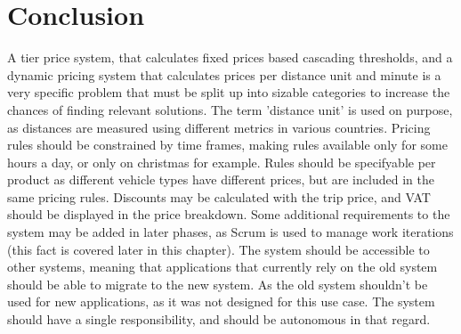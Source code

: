 \graphicspath{{Chapter6/Figs/Vector/}{Chapter6/Figs/}}

%
\chapter{Conclusion}

A tier price system, that calculates fixed prices based cascading thresholds, and a dynamic pricing system that calculates prices per distance unit and minute is a very specific problem that must be split up into sizable categories to increase the chances of finding relevant solutions. The term 'distance unit' is used on purpose, as distances are measured using different metrics in various countries. Pricing rules should be constrained by time frames, making rules available only for some hours a day, or only on christmas for example. Rules should be specifyable per product as different vehicle types have different prices, but are included in the same pricing rules. Discounts may be calculated with the trip price, and VAT should be displayed in the price breakdown. Some additional requirements to the system may be added in later phases, as Scrum is used to manage work iterations (this fact is covered later in this chapter). The system should be accessible to other systems, meaning that applications that currently rely on the old system should be able to migrate to the new system. As the old system shouldn't be used for new applications, as it was not designed for this use case. The system should have a single responsibility, and should be autonomous in that regard.